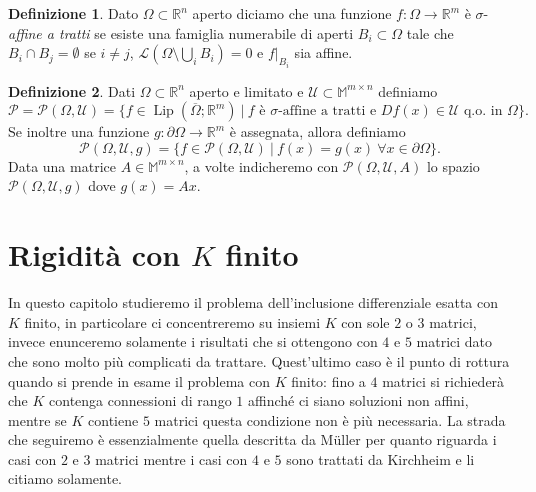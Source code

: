 \documentclass[a4paper,11pt]{book}
\theoremstyle{plain}
\theoremstyle{definition}
\newtheorem{defn}{Definizione}[chapter]
\theoremstyle{remark}
\newcommand{\R}{\mathbb{R}}
\newcommand{\M}{\mathbb{M}}
\newcommand{\LL}{\mathscr{L}}
\DeclareMathOperator{\Lip}{Lip}
\begin{document}
\begin{defn}\label{defn:3}
	Dato $\Omega\subset\R^{n}$ aperto diciamo che una funzione $f:\Omega\to\R^{m}$ è $\sigma$-\textit{affine a tratti} se esiste una famiglia numerabile di aperti $B_{i}\subset \Omega$ tale che $B_{i}\cap B_{j}=\emptyset$ se $i\neq j$, $\LL(\Omega\setminus\bigcup_{i}B_{i}) = 0$ e $f|_{B_{i}}$ sia affine.
\end{defn}
\begin{defn}\label{defn:5}
	Dati $\Omega\subset\R^n$ aperto e limitato e $\mathcal{U}\subset\M^{m\times n}$ definiamo
	\[
        \mathscr{P} = \mathscr{P}(\Omega,\mathcal{U}) = \{f\in \Lip(\overline{\Omega};\R^m)\ |\ f\text{ è }\sigma\text{-affine a tratti e }Df(x)\in\mathcal{U}\text{ q.o. in }\Omega\}.
	\]
	Se inoltre una funzione $g:\partial\Omega\to\R^m$ è assegnata, allora definiamo
	\[
		\mathscr{P}(\Omega,\mathcal{U},g)=\{f\in\mathscr{P}(\Omega,\mathcal{U})\ |\ f(x) = g(x)\ \forall x\in\partial\Omega\}.
	\]
	Data una matrice $A\in\M^{m\times n}$, a volte indicheremo con $\mathscr{P}(\Omega,\mathcal{U},A)$ lo spazio $\mathscr{P}(\Omega,\mathcal{U},g)$ dove $g(x)=Ax$.
\end{defn}


\chapter{Rigidità con $K$ finito}
In questo capitolo studieremo il problema dell'inclusione differenziale esatta con $K$ finito, in particolare ci concentreremo su insiemi $K$ con sole $2$ o $3$ matrici, invece enunceremo solamente i risultati che si ottengono con $4$ e $5$ matrici dato che sono molto più complicati da trattare. Quest'ultimo caso è il punto di rottura quando si prende in esame il problema con $K$ finito: fino a $4$ matrici si richiederà che $K$ contenga connessioni di rango $1$ affinché ci siano soluzioni non affini, mentre se $K$ contiene $5$ matrici questa condizione non è più necessaria. La strada che seguiremo è essenzialmente quella descritta da M{\"u}ller \cite{muller} per quanto riguarda i casi con $2$ e $3$ matrici mentre i casi con $4$ e $5$ sono trattati da Kirchheim \cite{kirchheim} e li citiamo solamente.
\end{document}
